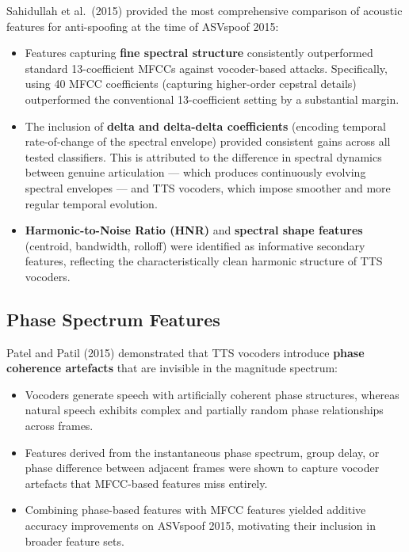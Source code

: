 \documentclass[12pt,a4paper]{article}
\begin{document}
Sahidullah et al.\ (2015) provided the most comprehensive comparison of acoustic features
for anti-spoofing at the time of ASVspoof 2015:

\begin{itemize}
  \item Features capturing \textbf{fine spectral structure} consistently outperformed
    standard 13-coefficient MFCCs against vocoder-based attacks. Specifically, using 40
    MFCC coefficients (capturing higher-order cepstral details) outperformed the
    conventional 13-coefficient setting by a substantial margin.
  \item The inclusion of \textbf{delta and delta-delta coefficients} (encoding temporal
    rate-of-change of the spectral envelope) provided consistent gains across all tested
    classifiers. This is attributed to the difference in spectral dynamics between genuine
    articulation --- which produces continuously evolving spectral envelopes --- and TTS
    vocoders, which impose smoother and more regular temporal evolution.
  \item \textbf{Harmonic-to-Noise Ratio (HNR)} and \textbf{spectral shape features}
    (centroid, bandwidth, rolloff) were identified as informative secondary features,
    reflecting the characteristically clean harmonic structure of TTS vocoders.
\end{itemize}

\subsection{Phase Spectrum Features}

Patel and Patil (2015) demonstrated that TTS vocoders introduce \textbf{phase coherence
artefacts} that are invisible in the magnitude spectrum:

\begin{itemize}
  \item Vocoders generate speech with artificially coherent phase structures, whereas
    natural speech exhibits complex and partially random phase relationships across frames.
  \item Features derived from the instantaneous phase spectrum, group delay, or phase
    difference between adjacent frames were shown to capture vocoder artefacts that
    MFCC-based features miss entirely.
  \item Combining phase-based features with MFCC features yielded additive accuracy
    improvements on ASVspoof 2015, motivating their inclusion in broader feature sets.
\end{itemize}
\end{document}
